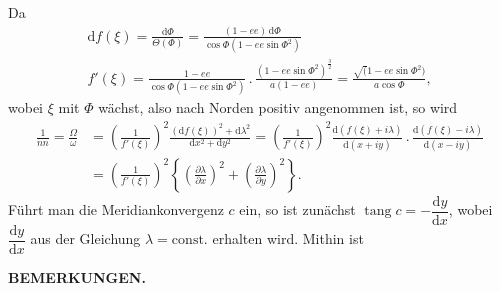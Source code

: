 {Da
\[
\begin{gathered}
\mathrm df(\xi)=\frac{\mathrm d\Phi}{\Theta(\Phi)}
=\frac{(1-ee)\,\mathrm d\Phi}{\cos\Phi(1-ee\sin\Phi^2)}\\
f'(\xi)=\frac{1-ee}{\cos\Phi(1-ee\sin\Phi^2)}
\,.\,\frac{(1-ee\sin\Phi^2)^{\frac32}}{a(1-ee)}
=\frac{\surd(1-ee\sin\Phi^2)}{a\cos\Phi},
\end{gathered}
\]
\noindent wobei \(\xi\) mit \(\Phi\) wächst, also nach Norden positiv angenommen ist, so wird
\[
\begin{aligned}
\frac1{nn}=\frac{\Omega}{\omega}
 &=\left(\frac1{f'(\xi)}\right)^2
 \frac{(\mathrm df(\xi))^2+\mathrm d\lambda^2}{\mathrm dx^2+\mathrm dy^2}
 =\left(\frac1{f'(\xi)}\right)^2
 \frac{\mathrm d(f(\xi)+i\lambda)}{\mathrm d(x+iy)}
 \,.\,\frac{\mathrm d(f(\xi)-i\lambda)}{\mathrm d(x-iy)}\\
 &=\left(\frac1{f'(\xi)}\right)^2
 \left\{\left(\frac{\partial\lambda}{\partial x}\right)^2+
 \left(\frac{\partial\lambda}{\partial y}\right)^2\right\}.
\end{aligned}
\]
Führt man die Meridiankonvergenz \(c\) ein, so ist zunächst
\(\operatorname{tang}c=-\dfrac{\mathrm dy}{\mathrm dx}\), wobei
\(\dfrac{\mathrm dy}{\mathrm dx}\) aus der Gleichung
\(\lambda=\mathrm{const.}\) erhalten wird. Mithin ist
\par}

\par\clearpage
\noindent{}\hfill{\small\textbf{BEMERKUNGEN.}}\hfill\null\par\medskip

